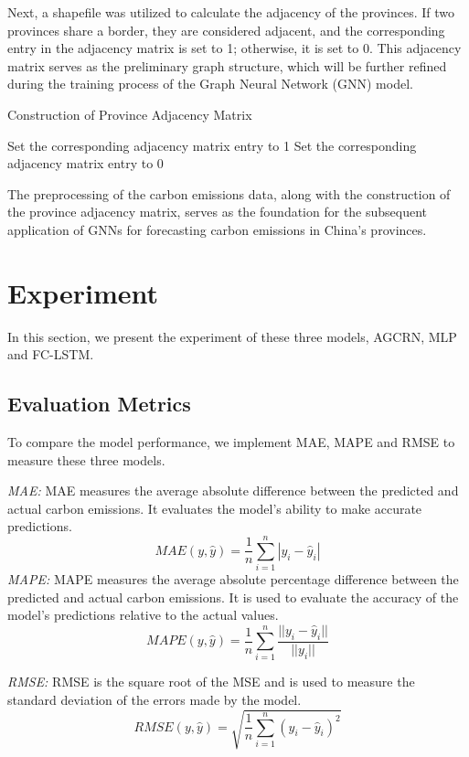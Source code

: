 \documentclass[sigconf, authordraft]{acmart}
\begin{document}
	Next, a shapefile was utilized to calculate the adjacency of the provinces. If
	two provinces share a border, they are considered adjacent, and the corresponding
	entry in the adjacency matrix is set to 1; otherwise, it is set to 0. This adjacency
	matrix serves as the preliminary graph structure, which will be further
	refined during the training process of the Graph Neural Network (GNN) model.

	\begin{algorithm}
		\caption{Construction of Province Adjacency Matrix}
		\begin{algorithmic}[1]
				\State Set the corresponding adjacency matrix entry to 1
			\Else
				\State Set the corresponding adjacency matrix entry to 0
			\EndIf
		\EndFor
		\end{algorithmic}
		\end{algorithm}

	The preprocessing of the carbon emissions data, along with the construction of
	the province adjacency matrix, serves as the foundation for the subsequent application
	of GNNs for forecasting carbon emissions in China's provinces.

	\section{Experiment}


	In this section, we present the experiment of these three models, AGCRN, MLP
	and FC-LSTM.

	\subsection{Evaluation Metrics }
	To compare the model performance, we implement MAE, MAPE and RMSE to measure
	these three models.

	\emph{MAE:} MAE measures the average absolute difference between the predicted
	and actual carbon emissions. It evaluates the model's ability to make accurate
	predictions.
	\[
		MAE(y, \hat{y}) = \frac{1}{n}\sum_{i=1}^{n}|y_{i}- \hat{y}_{i}|
	\]
	\emph{MAPE:} MAPE measures the average absolute percentage difference between
	the predicted and actual carbon emissions. It is used to evaluate the accuracy
	of the model's predictions relative to the actual values.
	\[
		MAPE(y, \hat{y}) = \frac{1}{n}\sum_{i=1}^{n}\frac{||y_{i}- \hat{y}_{i}||}{||y_{i}||}
	\]

	\emph{RMSE:} RMSE is the square root of the MSE and is used to measure the standard
	deviation of the errors made by the model.
	\[
		RMSE(y, \hat{y}) = \sqrt{\frac{1}{n}\sum_{i=1}^{n}(y_{i}- \hat{y}_{i})^{2}}
	\]
\end{document}
